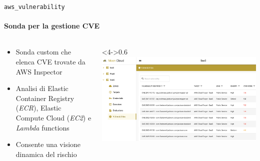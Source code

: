 \documentclass{beamer}
\begin{document}
\begin{frame}{\texttt{aws\_vulnerability}}
    \framesubtitle{Sonda per la gestione CVE}
    \begin{columns}
        \begin{column}{0.4\textwidth}
            \begin{itemize}
            \item<1-> Sonda custom che elenca CVE trovate da AWS Inspector
            \item<2-> Analisi di Elastic Container Registry (\emph{ECR}), 
                Elastic Compute Cloud (\emph{EC2}) e \emph{Lambda} functions
            \item<3-> Consente una visione dinamica del rischio
        \end{itemize}
        \end{column}
        \begin{column}<4->{0.6\textwidth}
            \includegraphics[width=\textwidth]{assets/cveiaas.png}
        \end{column}
    \end{columns}
\end{frame}
\end{document}
